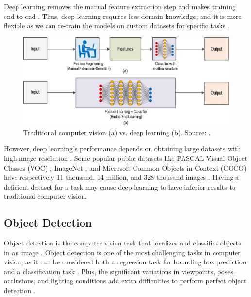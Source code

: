 \documentclass[a4paper, 11pt, oneside]{article}
\begin{document}
Deep learning removes the manual feature extraction step and makes training end-to-end \cite{elgendy2020deep, o2019deep}.
Thus, deep learning requires less domain knowledge, and it is more flexible as we can re-train the models on custom
datasets for specific tasks \cite{o2019deep}.

\begin{figure}[ht]
  \begin{center}
    \includegraphics[width=.7\textwidth]{deep_learning_vs_traditional_computer_vision.png}
  \end{center}
  \caption{Traditional computer vision (a) vs. deep learning (b). Source: \cite{o2019deep}.}
\end{figure}

However, deep learning's performance depends on obtaining large datasets with high image resolution \cite{o2019deep}.
Some popular public datasets like PASCAL Visual Object Classes (VOC) \cite{everingham2010pascal}, ImageNet
\cite{russakovsky2015imagenet}, and Microsoft Common Objects in Context (COCO) \cite{lin2014microsoft}
have respectively 11 thousand, 14 million, and 328 thousand images \cite{liu2020deep}. Having a deficient dataset
for a task may cause deep learning to have inferior results to traditional computer vision.

\subsection{Object Detection}

\label{sec:objectdetection}

Object detection is the computer vision task that localizes and classifies objects in an image
\cite{elgendy2020deep, zhao2019object, liu2020deep, geron2019hands}. Object detection is one of the most
challenging tasks in computer vision, as it can be considered both a regression task for bounding box prediction
and a classification task \cite{elgendy2020deep, geron2019hands, girshick2014rich}. Plus, the significant variations in
viewpoints, poses, occlusions, and lighting conditions add extra difficulties to perform perfect object detection
\cite{zhao2019object, liu2020deep}.
\end{document}

